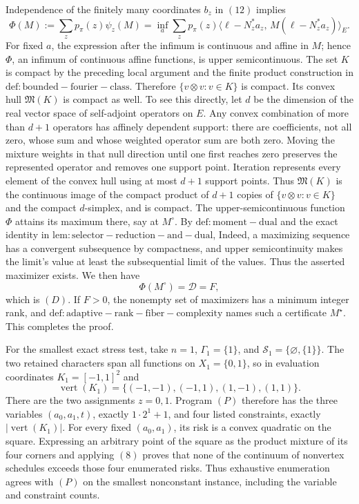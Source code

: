Independence of the finitely many coordinates \(b_z\) in \((12)\) implies
\[
 \Phi(M):=\sum_zp_\pi(z)\psi_z(M)
 =\inf_{a}\sum_zp_\pi(z)
 \langle\ell-N_z^{\ast}a_z,\,M(\ell-N_z^{\ast}a_z)\rangle_E.                    \tag{13}
\]
For fixed \(a\), the expression after the infimum is continuous and affine in \(M\); hence \(\Phi\), an infimum of continuous affine functions, is upper semicontinuous.  The set \(K\) is compact by the preceding local argument and the finite product construction in \(\mathrm{def:bounded-fourier-class}\).  Therefore \(\{v\otimes v:v\in K\}\) is compact.  Its convex hull \(\mathfrak M(K)\) is compact as well.  To see this directly, let \(d\) be the dimension of the real vector space of self-adjoint operators on \(E\).  Any convex combination of more than \(d+1\) operators has affinely dependent support: there are coefficients, not all zero, whose sum and whose weighted operator sum are both zero.  Moving the mixture weights in that null direction until one first reaches zero preserves the represented operator and removes one support point.  Iteration represents every element of the convex hull using at most \(d+1\) support points.  Thus \(\mathfrak M(K)\) is the continuous image of the compact product of \(d+1\) copies of \(\{v\otimes v:v\in K\}\) and the compact \(d\)-simplex, and is compact.  The upper-semicontinuous function \(\Phi\) attains its maximum there, say at \(M^{\circ}\).  By \(\mathrm{def:moment-dual}\) and the exact identity in \(\mathrm{lem:selector-reduction-and-dual}\),
Indeed, a maximizing sequence has a convergent subsequence by compactness, and upper semicontinuity makes the limit's value at least the subsequential limit of the values.  Thus the asserted maximizer exists.  We then have
\[
 \Phi(M^{\circ})=\mathcal D=F,
\]
which is \((D)\).  If \(F>0\), the nonempty set of maximizers has a minimum integer rank, and \(\mathrm{def:adaptive-rank-fiber-complexity}\) names such a certificate \(M^{\star}\).  This completes the proof.

For the smallest exact stress test, take \(n=1\), \(\Gamma_1=\{1\}\), and \(\mathcal S_1=\{\varnothing,\{1\}\}\).  The two retained characters span all functions on \(X_1=\{0,1\}\), so in evaluation coordinates \(K_1=[-1,1]^2\) and
\[
 \operatorname{vert}(K_1)=\{(-1,-1),(-1,1),(1,-1),(1,1)\}.
\]
There are the two assignments \(z=0,1\).  Program \((P)\) therefore has the three variables \((a_0,a_1,t)\), exactly \(1\cdot2^1+1\), and four listed constraints, exactly \(\lvert\operatorname{vert}(K_1)\rvert\).  For every fixed \((a_0,a_1)\), its risk is a convex quadratic on the square.  Expressing an arbitrary point of the square as the product mixture of its four corners and applying \((8)\) proves that none of the continuum of nonvertex schedules exceeds those four enumerated risks.  Thus exhaustive enumeration agrees with \((P)\) on the smallest nonconstant instance, including the variable and constraint counts.